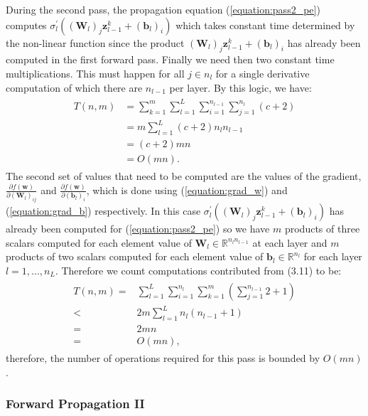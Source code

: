 \documentclass[letterpaper,12pt,titlepage,oneside,final]{book}
\begin{document}
	During the second pass, the propagation equation (\ref{equation:pass2_pe}) computes $\sigma_{l}^{\prime}((\mathbf{W}_{l})_{j}\mathbf{z}_{l-1}^{k} + (\mathbf{b}_{l})_{i})$ which takes constant time determined by the non-linear function since the product $(\mathbf{W}_{l})_{j}\mathbf{z}_{l-1}^{k} + (\mathbf{b}_{l})_{i}$ has already been computed in the first forward pass. Finally we need then two constant time multiplications. This must happen for all $j \in n_{l}$ for a single derivative computation of which there are $n_{l-1}$ per layer. By this logic, we have:
	\begin{align}
	\begin{split}
	T(n,m) & =  \sum_{k=1}^{m}{\sum_{l=1}^{L}{\sum_{i=1}^{n_{l-1}}{{\sum_{j=1}^{n_{l}}{(c+2)}}}}} \\
	& = m\sum_{l=1}^{L}{(c+2)n_{l}n_{l-1}} \\
	& = (c+2)mn \\
	& = O(mn).
	\end{split}
	\end{align}
	The second set of values that need to be computed are the values of the gradient, $\frac{\partial{f(\mathbf{w})}}{\partial{(\mathbf{W}_{l})_{ij}}}$ and $\frac{\partial{f(\mathbf{w})}}{\partial{(\mathbf{b}_{l})_{i}}}$, which is done using (\ref{equation:grad_w}) and (\ref{equation:grad_b}) respectively. In this case $\sigma_{l}^{\prime}((\mathbf{W}_{l})_{j}\mathbf{z}_{l-1}^{k} + (\mathbf{b}_{l})_{i})$ has already been computed for (\ref{equation:pass2_pe}) so we have $m$ products of three scalars computed for each element value of $\mathbf{W}_{l} \in \mathbb{R}^{n_{l}n_{l-1}}$ at each layer and $m$ products of two scalars computed for each element value of $\mathbf{b}_{l} \in \mathbb{R}^{n_{l}}$ for each layer $l=1,...,n_{L}$. Therefore we count computations contributed from (3.11) to be:
	\begin{align}
	\begin{split}
	T(n,m) = & \sum_{l=1}^{L}{\sum_{i = 1}^{n_{l}}{{\sum_{k=1}^{m}{(\sum_{j=1}^{n_{l-1}}{2} + 1)}}}} \\
	< & 2m\sum_{l=1}^{L}{n_{l}(n_{l-1}+1)}\\
	= & 2mn \\
	= & O(mn),
	\end{split}
	\end{align}
	therefore, the number of operations required for this pass is bounded by $O(mn)$.
	
	\subsubsection{Forward Propagation II}
	
\end{document}
